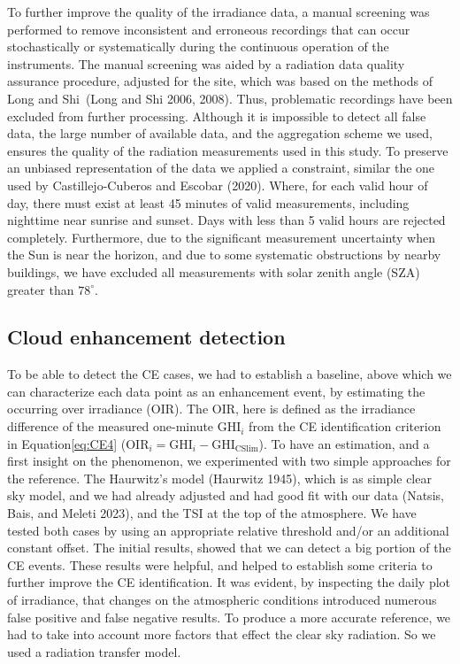 \documentclass[
  preprint, 3p, authoryear]{article}
\begin{document}
To further improve the quality of the irradiance data, a manual screening was
performed to remove inconsistent and erroneous recordings that can occur
stochastically or systematically during the continuous operation of the instruments.
The manual screening was aided by a radiation data quality assurance procedure,
adjusted for the site, which was based on the methods of Long and Shi~(Long and Shi 2006, 2008). Thus, problematic recordings have been excluded from further
processing. Although it is impossible to detect all false data, the large number of
available data, and the aggregation scheme we used, ensures the quality of the
radiation measurements used in this study.
To preserve an unbiased representation of the data we applied a constraint, similar
the one used by Castillejo-Cuberos and Escobar (2020). Where, for each valid hour of day, there must
exist at least 45 minutes of valid measurements, including nighttime near sunrise and
sunset. Days with less than 5 valid hours are rejected completely.
Furthermore, due to the significant measurement uncertainty when the Sun is near the
horizon, and due to some systematic obstructions by nearby buildings, we have
excluded all measurements with solar zenith angle (SZA) greater than
\(78^\circ\).

\hypertarget{cloud-enhancement-detection}{%
\subsection{Cloud enhancement detection}\label{cloud-enhancement-detection}}

To be able to detect the CE cases, we had to establish a baseline, above which we can
characterize each data point as an enhancement event, by estimating the occurring
over irradiance (OIR). The OIR, here is defined as the irradiance difference of the
measured one-minute \(\text{GHI}_i\) from the CE identification criterion in
Equation\nobreakspace\ref{eq:CE4}
(\(\text{OIR}_i = \text{GHI}_i - \text{GHI}_\text{CSlim}\)).
To have an estimation, and a first insight on the phenomenon, we experimented with two
simple approaches for the reference. The Haurwitz's model (Haurwitz 1945), which is
as simple clear sky model, and we had already adjusted and had good fit with our data
(Natsis, Bais, and Meleti 2023), and the TSI at the top of the atmosphere. We have tested both cases
by using an appropriate relative threshold and/or an additional constant offset. The
initial results, showed that we can detect a big portion of the CE events. These
results were helpful, and helped to establish some criteria to further improve the CE
identification. It was evident, by inspecting the daily plot of irradiance, that
changes on the atmospheric conditions introduced numerous false positive and false
negative results. To produce a more accurate reference, we had to take into account
more factors that effect the clear sky radiation. So we used a radiation transfer
model.
\end{document}
